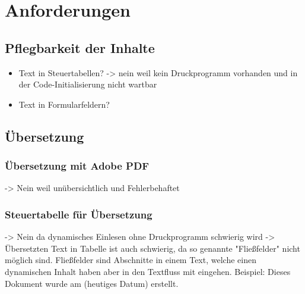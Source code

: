 \chapter{Anforderungen}
\label{ch:Anforderungen}



\section{Pflegbarkeit der Inhalte}
	\begin{itemize}
		\item Text in Steuertabellen?
				-> nein weil kein Druckprogramm vorhanden und in der Code-Initialisierung nicht wartbar
		\item Text in Formularfeldern?
	\end{itemize}

\section{Übersetzung}

\subsection{Übersetzung mit Adobe PDF}
				-> Nein weil unübersichtlich und Fehlerbehaftet
\subsection{Steuertabelle für Übersetzung}
				-> Nein da dynamisches Einlesen ohne Druckprogramm schwierig wird
				-> Übersetzten Text in Tabelle ist auch schwierig, da so genannte "Fließfelder" nicht möglich sind.
				Fließfelder sind Abschnitte in einem Text, welche einen dynamischen Inhalt haben aber in den Textfluss mit eingehen. Beispiel: Dieses Dokument wurde am (heutiges Datum) erstellt.